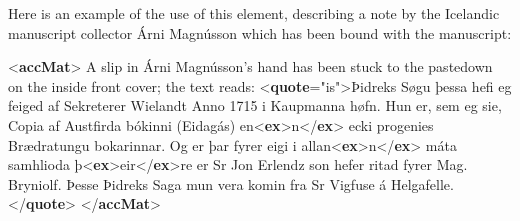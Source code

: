 Here is an example of the use of this element, describing a note by the Icelandic manuscript collector Árni Magnússon which has been bound with the manuscript: \par\bgroup{}\exampleFont \begin{shaded}\noindent\mbox{}{<\textbf{accMat}>}\mbox{}\newline 
{}A slip in Árni Magnússon's hand has been stuck to the pastedown on the inside\mbox{}\newline 
\hspace*{1em}\hspace*{1em} front cover; the text reads: {<\textbf{quote}\hspace*{1em}{xml:lang}="{is}">}Þidreks Søgu þessa hefi eg\mbox{}\newline 
\hspace*{1em}\hspace*{1em}\hspace*{1em}\hspace*{1em} feiged af Sekreterer Wielandt Anno 1715 i Kaupmanna høfn. Hun er, sem eg sie,\mbox{}\newline 
\hspace*{1em}\hspace*{1em}\hspace*{1em}\hspace*{1em} Copia af Austfirda bókinni (Eidagás) en{<\textbf{ex}>}n{</\textbf{ex}>} ecki progenies Brædratungu\mbox{}\newline 
\hspace*{1em}\hspace*{1em}\hspace*{1em}\hspace*{1em} bokarinnar. Og er þar fyrer eigi i allan{<\textbf{ex}>}n{</\textbf{ex}>} máta samhlioda\mbox{}\newline 
\hspace*{1em}\hspace*{1em}\hspace*{1em}\hspace*{1em} þ{<\textbf{ex}>}eir{</\textbf{ex}>}re er Sr Jon Erlendz son hefer ritad fyrer Mag. Bryniolf. Þesse\mbox{}\newline 
\hspace*{1em}\hspace*{1em}\hspace*{1em}\hspace*{1em} Þidreks Saga mun vera komin fra Sr Vigfuse á Helgafelle.{</\textbf{quote}>}\mbox{}\newline 
{}\mbox{}\newline 
{</\textbf{accMat}>}\end{shaded}\egroup\par 
